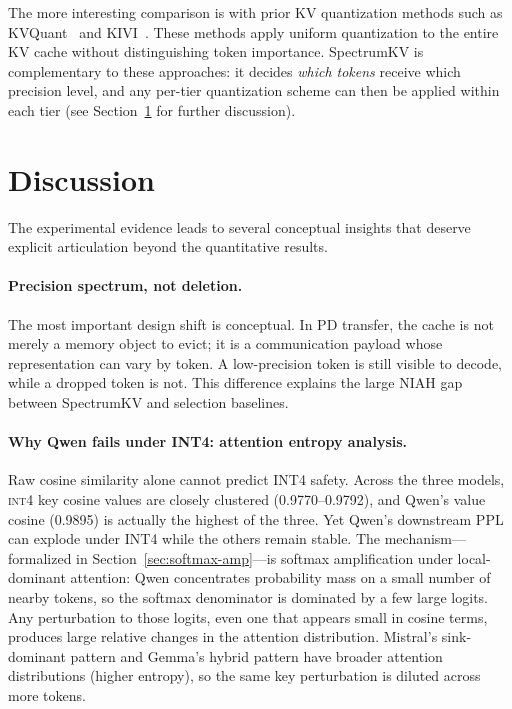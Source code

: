 \documentclass[11pt]{article}
\newcommand{\method}{SpectrumKV}
\newcommand{\niah}{NIAH}
\newcommand{\intiv}{\textsc{int4}}
\theoremstyle{plain}
\theoremstyle{definition}
\begin{document}
The more interesting comparison is with prior KV quantization methods such as KVQuant~\citep{kvquant} and KIVI~\citep{kivi}.  These methods apply uniform quantization to the entire KV cache without distinguishing token importance.  \method{} is complementary to these approaches: it decides \emph{which tokens} receive which precision level, and any per-tier quantization scheme can then be applied within each tier (see Section~\ref{sec:discussion} for further discussion).

\section{Discussion}
\label{sec:discussion}

The experimental evidence leads to several conceptual insights that deserve explicit articulation beyond the quantitative results.

\paragraph{Precision spectrum, not deletion.}
The most important design shift is conceptual.  In PD transfer, the cache is not merely a memory object to evict; it is a communication payload whose representation can vary by token.  A low-precision token is still visible to decode, while a dropped token is not.  This difference explains the large \niah{} gap between \method{} and selection baselines.

\paragraph{Why Qwen fails under INT4: attention entropy analysis.}
Raw cosine similarity alone cannot predict INT4 safety.  Across the three models, \intiv{} key cosine values are closely clustered (0.9770--0.9792), and Qwen's value cosine (0.9895) is actually the highest of the three.  Yet Qwen's downstream PPL can explode under INT4 while the others remain stable.  The mechanism---formalized in Section~\ref{sec:softmax-amp}---is softmax amplification under local-dominant attention: Qwen concentrates probability mass on a small number of nearby tokens, so the softmax denominator is dominated by a few large logits.  Any perturbation to those logits, even one that appears small in cosine terms, produces large relative changes in the attention distribution.  Mistral's sink-dominant pattern and Gemma's hybrid pattern have broader attention distributions (higher entropy), so the same key perturbation is diluted across more tokens.
\end{document}
